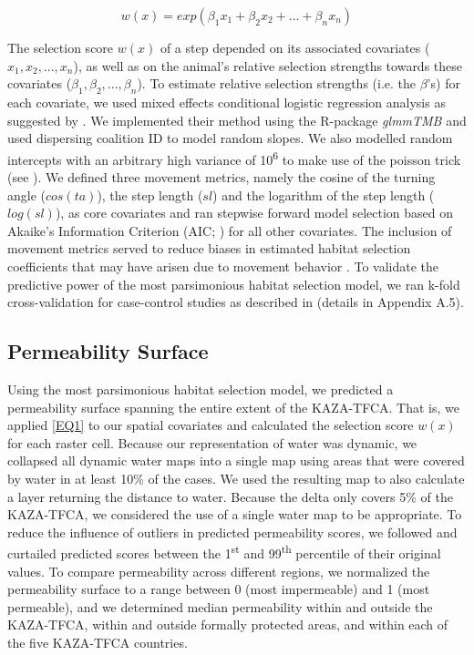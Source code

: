\documentclass[abstract=on,10pt,a4paper,bibliography=totocnumbered]{article}
\begin{document}
\begin{equation}
\label{EQ1}
  w(x) = exp(\beta_1 x_1 + \beta_2 x_2 + ... + \beta_n x_n)
\end{equation}

\noindent The selection score \(w(x)\) of a step depended on its associated
covariates (\(x_1, x_2, ..., x_n\)), as well as on the animal's relative
selection strengths towards these covariates (\(\beta_1, \beta_2, ...,
\beta_n\)). To estimate relative selection strengths (i.e. the \(\beta\)'s) for
each covariate, we used mixed effects conditional logistic regression analysis
as suggested by \cite{Muff.2020}. We implemented their method using the
R-package \textit{glmmTMB} \citep{Mollie.2017} and used dispersing coalition ID
to model random slopes. We also modelled random intercepts with an arbitrary
high variance of 10\textsuperscript{6} to make use of the poisson trick (see
\citealp{Muff.2020}). We defined three movement metrics, namely the cosine of
the turning angle (\(cos(ta)\)), the step length (\(sl\)) and the logarithm of
the step length (\(log(sl)\)), as core covariates and ran stepwise forward model
selection based on Akaike's Information Criterion (AIC; \citealp{Burnham.2002})
for all other covariates. The inclusion of movement metrics served to reduce
biases in estimated habitat selection coefficients that may have arisen due to
movement behavior \citep{Avgar.2016}. To validate the predictive power of the
most parsimonious habitat selection model, we ran k-fold cross-validation for
case-control studies as described in \cite{Fortin.2009} (details in Appendix
A.5).

\subsection{Permeability Surface}
Using the most parsimonious habitat selection model, we predicted a permeability
surface spanning the entire extent of the KAZA-TFCA. That is, we applied
\ref{EQ1} to our spatial covariates and calculated the selection score \(w(x)\)
for each raster cell. Because our representation of water was dynamic, we
collapsed all dynamic water maps into a single map using areas that were covered
by water in at least 10\% of the cases. We used the resulting map to also
calculate a layer returning the distance to water. Because the delta only covers
5\% of the KAZA-TFCA, we considered the use of a single water map to be
appropriate. To reduce the influence of outliers in predicted permeability
scores, we followed \cite{Squires.2013} and curtailed predicted scores between
the 1\textsuperscript{st} and 99\textsuperscript{th} percentile of their
original values. To compare permeability across different regions, we normalized
the permeability surface to a range between 0 (most impermeable) and 1 (most
permeable), and we determined median permeability within and outside the
KAZA-TFCA, within and outside formally protected areas, and within each of the
five KAZA-TFCA countries.
\end{document}
